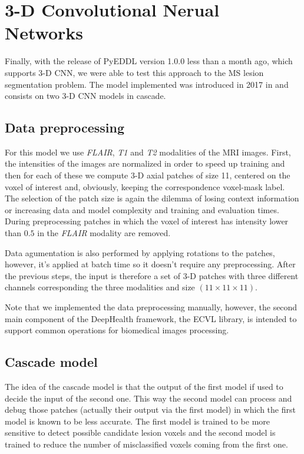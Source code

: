 \chapter{3-D Convolutional Nerual Networks}
\label{4.3D_CNN}

Finally, with the release of PyEDDL version 1.0.0 less than a month ago, which supports 3-D CNN, we were able to test this approach to the MS lesion segmentation problem. The model implemented was introduced in 2017 in \cite{VALVERDE:2017} and consists on two 3-D CNN models in cascade. 

\section{Data preprocessing}

For this model we use \textit{FLAIR}, \textit{T1} and \textit{T2} modalities of the MRI images. First, the intensities of the images are normalized in order to speed up training and then for each of these we compute 3-D axial patches of size 11, centered on the voxel of interest and, obviously, keeping the correspondence voxel-mask label. The selection of the patch size is again the dilemma of losing context information or increasing data and model complexity and training and evaluation times. During preprocessing patches in which the voxel of interest has intensity lower than $0.5$ in the \textit{FLAIR} modality are removed.

Data agumentation is also performed by applying rotations to the patches, however, it's applied at batch time so it doesn't require any preprocessing. After the previous steps, the input is therefore a set of 3-D patches with three different channels corresponding the three modalities and size $(11\times11\times11)$.

Note that we implemented the data preprocessing manually, however, the second main component of the DeepHealth framework, the ECVL library, is intended to support common operations for biomedical images processing.


\section{Cascade model}

The idea of the cascade model is that the output of the first model if used to decide the input of the second one. This way the second model can process and debug those patches (actually their output via the first model) in which the first model is known to be less accurate. The first model is trained to be more sensitive to detect possible candidate lesion
voxels and the second model is trained to reduce the number of misclassified voxels coming from the
first one.

